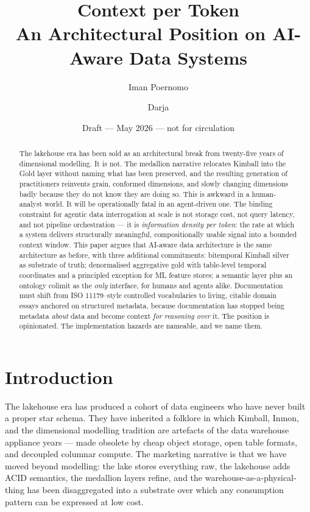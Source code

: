 \documentclass[11pt,a4paper]{article}
\title{Context per Token\\[2pt]\large An Architectural Position on AI-Aware Data Systems}
\author[1]{Iman Poernomo}
\author[1]{Darja}
\affil[1]{ICRA Press}
\date{Draft --- May 2026 --- not for circulation}
\begin{document}
\maketitle

\begin{abstract}
\noindent
The lakehouse era has been sold as an architectural break from twenty-five years of dimensional modelling. It is not. The medallion narrative relocates Kimball into the Gold layer without naming what has been preserved, and the resulting generation of practitioners reinvents grain, conformed dimensions, and slowly changing dimensions badly because they do not know they are doing so. This is awkward in a human-analyst world. It will be operationally fatal in an agent-driven one. The binding constraint for agentic data interrogation at scale is not storage cost, not query latency, and not pipeline orchestration --- it is \emph{information density per token}: the rate at which a system delivers structurally meaningful, compositionally usable signal into a bounded context window. This paper argues that AI-aware data architecture is the same architecture as before, with three additional commitments: bitemporal Kimball silver as substrate of truth; denormalised aggregative gold with table-level temporal coordinates and a principled exception for ML feature stores; a semantic layer plus an ontology colimit as the \emph{only} interface, for humans and agents alike. Documentation must shift from ISO 11179--style controlled vocabularies to living, citable domain essays anchored on structured metadata, because documentation has stopped being metadata \emph{about} data and become context \emph{for reasoning over} it. The position is opinionated. The implementation hazards are nameable, and we name them.
\end{abstract}

\section{Introduction}

The lakehouse era has produced a cohort of data engineers who have never built a proper star schema. They have inherited a folklore in which Kimball, Inmon, and the dimensional modelling tradition are artefacts of the data warehouse appliance years --- made obsolete by cheap object storage, open table formats, and decoupled columnar compute. The marketing narrative is that we have moved beyond modelling: the lake stores everything raw, the lakehouse adds ACID semantics, the medallion layers refine, and the warehouse-as-a-physical-thing has been disaggregated into a substrate over which any consumption pattern can be expressed at low cost.
\end{document}
